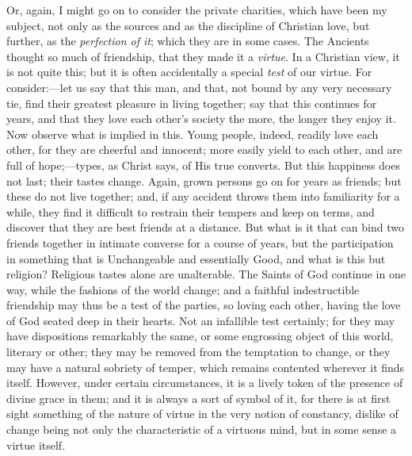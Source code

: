 Or, again, I might go on to consider the private charities, which
have been my subject, not only as the sources and as the discipline of
Christian love, but further, as the \emph{perfection of it}; which
they are in some cases. The Ancients thought so much of friendship,
that they made it a \emph{virtue}. In a Christian view, it is not
quite this; but it is often accidentally a special \emph{test} of our
virtue. For consider:—let us say that this man, and that, not bound
by any very necessary tie, find their greatest pleasure in living
together; say that this continues for years, and that they love each
other's society the more, the longer they enjoy it. Now observe what
is implied in this. Young people, indeed, readily love each other, for
they are cheerful and innocent; more easily yield to each other, and
are full of hope;—types, as Christ says, of His true converts. But
this happiness does not last; their tastes change. Again, grown
persons go on for years as friends; but these do not live together;
and, if any accident throws them into familiarity for a while, they
find it difficult to restrain their tempers and keep on terms, and
discover that they are best friends at a distance. But what is it that
can bind two friends together in intimate converse for a course of
years, but the participation in something that is Unchangeable and
essentially Good, and what is this but religion? Religious tastes
alone are unalterable. The Saints of God continue in one way, while
the fashions of the world change; and a faithful indestructible
friendship may thus be a test of the parties, so loving each other,
having the love of God seated deep in their hearts. Not an infallible
test certainly; for they may have dispositions remarkably the same, or
some engrossing object of this world, literary or other; they may be
removed from the temptation to change, or they may have a natural
sobriety of temper, which remains contented wherever it finds itself.
However, under certain circumstances, it is a lively token of the presence of divine grace in them; and it is always a sort of symbol of
it, for there is at first sight something of the nature of virtue in
the very notion of constancy, dislike of change being not only the
characteristic of a virtuous mind, but in some sense a virtue itself.

